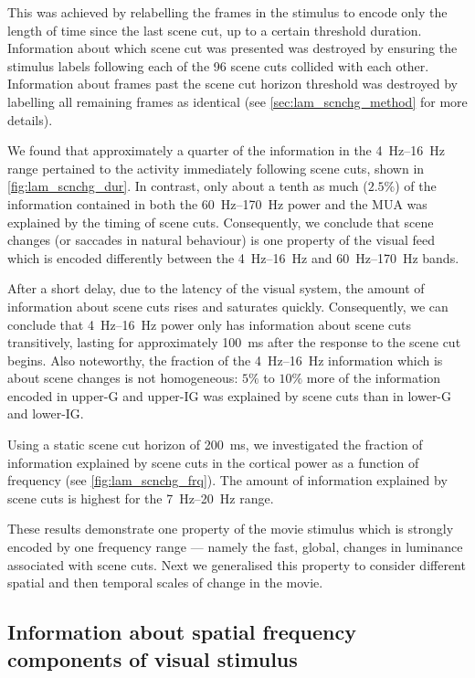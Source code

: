 This was achieved by relabelling the frames in the stimulus to encode only the length of time since the last scene cut, up to a certain threshold duration.
Information about which scene cut was presented was destroyed by ensuring the stimulus labels following each of the \num{96} scene cuts collided with each other.
Information about frames past the scene cut horizon threshold was destroyed by labelling all remaining frames as identical (see \autoref{sec:lam_scnchg_method} for more details).

We found that approximately a quarter of the information in the \SIrange{4}{16}{Hz} range pertained to the activity immediately following scene cuts, shown in \autoref{fig:lam_scnchg_dur}.
In contrast, only about a tenth as much ($2.5\%$) of the information contained in both the \SIrange{60}{170}{Hz} power and the \ac{MUA} was explained by the timing of scene cuts.
Consequently, we conclude that scene changes (or saccades in natural behaviour) is one property of the visual feed which is encoded differently between the \SIrange{4}{16}{Hz} and \SIrange{60}{170}{Hz} bands.

After a short delay, due to the latency of the visual system, the amount of information about scene cuts rises and saturates quickly.
Consequently, we can conclude that \SIrange{4}{16}{Hz} power only has information about scene cuts transitively, lasting for approximately \SI{100}{\milli\second} after the response to the scene cut begins.
Also noteworthy, the fraction of the \SIrange{4}{16}{Hz} information which is about scene changes is not homogeneous: $5\%$ to $10\%$ more of the information encoded in upper-\ac{G} and upper-\ac{IG} was explained by scene cuts than in lower-\ac{G} and lower-\ac{IG}.

Using a static scene cut horizon of \SI{200}{\milli\second}, we investigated the fraction of information explained by scene cuts in the cortical power as a function of frequency (see \autoref{fig:lam_scnchg_frq}).
The amount of information explained by scene cuts is highest for the \SIrange{7}{20}{Hz} range.

These results demonstrate one property of the movie stimulus which is strongly encoded by one frequency range --- namely the fast, global, changes in luminance associated with scene cuts.
Next we generalised this property to consider different spatial and then temporal scales of change in the movie.


\subsection{Information about spatial frequency components of visual stimulus}

